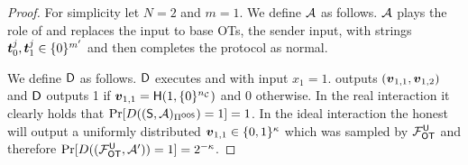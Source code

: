 


\begin{proof}\label{proof:Attack_BadT0}
	For simplicity let $N=2$ and $m=1$. We define $\Adv$ as follows. $\Adv$ plays the role of \rec and replaces the input to base OTs, the sender input, with strings $\tt_0^j,\tt_1^j\in \{0\}^{m'}$ and then completes the protocol as normal.
	
	We define $\D$ as follows. $\D$ executes \send and \Adv with input $x_1=1$. \send outputs $(\vv_{1,1},\vv_{1,2})$ and $\D$ outputs 1 if $\vv_{1,1}=\H(1, \{0\}^\nc)$ and 0 otherwise. In the real interaction it clearly holds that $\Pr[D((\send, \Adv)_{\Pi^{\textsf{OOS}}})=1]=1$. In the ideal interaction the honest \send will output a uniformly distributed $\vv_{1,1}\in\{0,1\}^\kappa$ which was sampled by $\OOT^{\U}$ and therefore $\Pr[D((\OOT^{\U}, \Adv'))=1]=2^{-\kappa}$.
	\pe
\end{proof}
